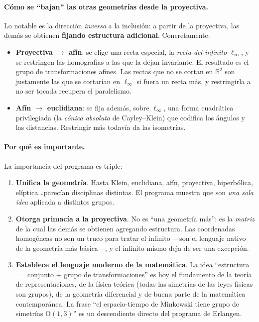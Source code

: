 \documentclass[11pt,a4paper]{article}
\newcommand{\R}{\mathbb{R}}
\begin{document}
\paragraph{Cómo se ``bajan'' las otras geometrías desde la proyectiva.}
Lo notable es la dirección \emph{inversa} a la inclusión: a partir de
la proyectiva, las demás se obtienen \textbf{fijando estructura
adicional}. Concretamente:
\begin{itemize}[leftmargin=1.4em,itemsep=2pt]
\item \textbf{Proyectiva $\to$ afín}: se elige una recta especial, la
  \emph{recta del infinito} $\ell_\infty$, y se restringen las
  homografías a las que la dejan invariante. El resultado es el grupo
  de transformaciones afines. Las rectas que no se cortan en $\R^2$
  son justamente las que se cortarían en $\ell_\infty$ si fuera un
  recta más, y restringirla a no ser tocada recupera el paralelismo.
\item \textbf{Afín $\to$ euclidiana}: se fija además, sobre
  $\ell_\infty$, una forma cuadrática privilegiada (la
  \emph{cónica absoluta} de Cayley--Klein) que codifica los ángulos y
  las distancias. Restringir más todavía da las isometrías.
\end{itemize}

\paragraph{Por qué es importante.} La importancia del programa es
triple:
\begin{enumerate}[leftmargin=1.4em,itemsep=2pt]
\item \textbf{Unifica la geometría}. Hasta Klein, euclidiana, afín,
  proyectiva, hiperbólica, elíptica\,\ldots parecían disciplinas
  distintas. El programa muestra que son \emph{una sola idea} aplicada
  a distintos grupos.
\item \textbf{Otorga primacía a la proyectiva}. No es ``una geometría
  más'': es la \emph{matriz} de la cual las demás se obtienen
  agregando estructura. Las coordenadas homogéneas no son un truco
  para tratar el infinito —son el lenguaje nativo de la geometría más
  básica—, y el infinito mismo deja de ser una excepción.
\item \textbf{Establece el lenguaje moderno de la matemática}.
  La idea ``estructura $=$ conjunto $+$ grupo de transformaciones'' es
  hoy el fundamento de la teoría de representaciones, de la física
  teórica (todas las simetrías de las leyes físicas son grupos), de
  la geometría diferencial y de buena parte de la matemática
  contemporánea. La frase ``el espacio-tiempo de Minkowski tiene grupo
  de simetrías $\mathrm{O}(1,3)$'' es un descendiente directo del
  programa de Erlangen.
\end{enumerate}
\end{document}
